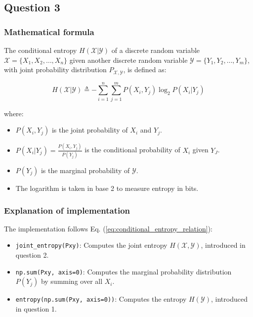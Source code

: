 \documentclass{article}
\begin{document}
\subsection*{Question 3}

\subsubsection*{Mathematical formula}

The conditional entropy $H(\mathcal{X} | \mathcal{Y})$ of a discrete random variable $\mathcal{X} = \{X_1, X_2, \ldots, X_n\}$ given another discrete random variable $\mathcal{Y} = \{Y_1, Y_2, \ldots, Y_m\}$, with joint probability distribution $P_{\mathcal{X},\mathcal{Y}}$, is defined as:

\begin{equation}
H(\mathcal{X} | \mathcal{Y}) \triangleq - \sum_{i=1}^{n} \sum_{j=1}^{m} P(X_i, Y_j) \log_2 P(X_i | Y_j)
\end{equation}

where:
\begin{itemize}
    \item $P(X_i, Y_j)$ is the joint probability of $X_i$ and $Y_j$.
    \item $P(X_i | Y_j) = \frac{P(X_i, Y_j)}{P(Y_j)}$ is the conditional probability of $X_i$ given $Y_J$.
    \item $P(Y_j)$ is the marginal probability of $\mathcal{Y}$.
    \item The logarithm is taken in base 2 to measure entropy in bits.
\end{itemize}

\subsubsection*{Explanation of implementation}

The implementation follows Eq. (\ref{eq:conditional_entropy_relation}):
\begin{itemize}
    \item \texttt{joint\_entropy(Pxy)}: Computes the joint entropy $H(\mathcal{X}, \mathcal{Y})$, introduced in question 2.
    \item \texttt{np.sum(Pxy, axis=0)}: Computes the marginal probability distribution $P(Y_j)$ by summing over all $X_i$.
    \item \texttt{entropy(np.sum(Pxy, axis=0))}: Computes the entropy $H(\mathcal{Y})$, introduced in question 1.
\end{itemize}
\end{document}
